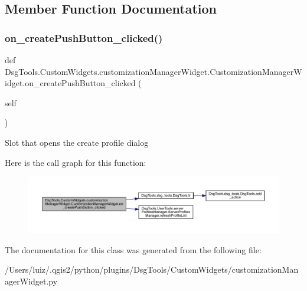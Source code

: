 \subsection{Member Function Documentation}
\mbox{\label{class_dsg_tools_1_1_custom_widgets_1_1customization_manager_widget_1_1_customization_manager_widget_a8374e5841867eb5478eb75a4a404b810}} 
\subsubsection{\texorpdfstring{on\+\_\+create\+Push\+Button\+\_\+clicked()}{on\_createPushButton\_clicked()}}
{\footnotesize\ttfamily def Dsg\+Tools.\+Custom\+Widgets.\+customization\+Manager\+Widget.\+Customization\+Manager\+Widget.\+on\+\_\+create\+Push\+Button\+\_\+clicked (\begin{DoxyParamCaption}\item[{}]{self }\end{DoxyParamCaption})}

\begin{DoxyVerb}Slot that opens the create profile dialog
\end{DoxyVerb}
 Here is the call graph for this function\+:
\nopagebreak
\begin{figure}[H]
\begin{center}
\leavevmode
\includegraphics[width=350pt]{class_dsg_tools_1_1_custom_widgets_1_1customization_manager_widget_1_1_customization_manager_widget_a8374e5841867eb5478eb75a4a404b810_cgraph}
\end{center}
\end{figure}


The documentation for this class was generated from the following file\+:\begin{DoxyCompactItemize}
\item 
/\+Users/luiz/.\+qgis2/python/plugins/\+Dsg\+Tools/\+Custom\+Widgets/customization\+Manager\+Widget.\+py\end{DoxyCompactItemize}
